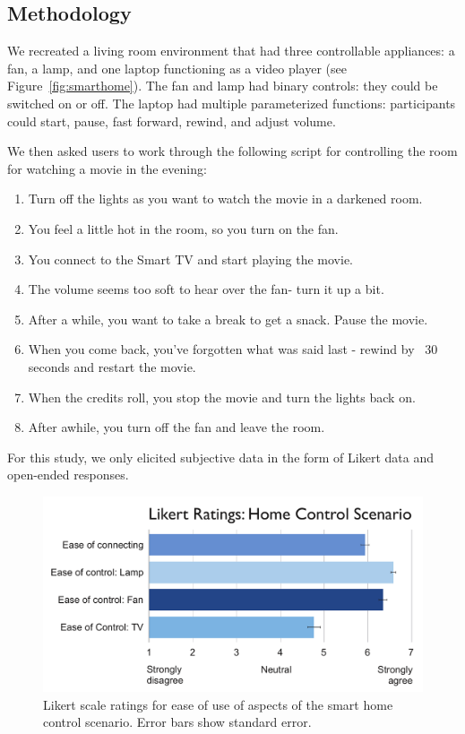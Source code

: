 \documentclass{sigchi}
\begin{document}
\subsection{Methodology}
We recreated a living room environment that had three controllable appliances: a fan, a lamp, and one laptop functioning as a video player (see Figure~\ref{fig:smarthome}). The fan and lamp had binary controls: they could be switched on or off. The laptop had multiple parameterized functions: participants could start, pause, fast forward, rewind, and adjust volume.

We then asked users to work through the following script for controlling the room for watching a movie in the evening:
{\small
\begin{enumerate}
\item Turn off the lights as you want to watch the movie in a darkened room.
\item You feel a little hot in the room, so you turn on the fan.
\item You connect to the Smart TV and start playing the movie. 
\item The volume seems too soft to hear over the fan- turn it up a bit. 
\item After a while, you want to take a break to get a snack. Pause the movie. 
\item When you come back, you've forgotten what was said last - rewind by ~30 seconds and restart the movie. 
\item When the credits roll, you stop the movie and turn the lights back on.
\item After awhile, you turn off the fan and leave the room.
\end{enumerate}
}

For this study, we only elicited subjective data in the form of Likert data and open-ended responses.
\begin{figure}[t]
\centering
\includegraphics[width=1.0\columnwidth]{figures/scenario-likert.pdf}
\caption{Likert scale ratings for ease of use of aspects of the smart home control scenario. Error bars show standard error.}
\label{fig:smarthome-likert}
\end{figure}
\end{document}
